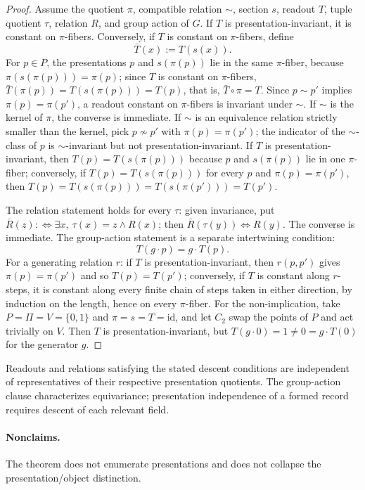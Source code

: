 \begin{proof}
Assume the quotient \(\pi\), compatible relation \(\sim\), section
\(s\), readout \(T\), tuple quotient \(\tau\), relation \(R\), and
group action of \(G\).  If \(T\) is presentation-invariant, it is
constant on \(\pi\)-fibers.  Conversely, if \(T\) is constant on
\(\pi\)-fibers, define
\[
  \bar T(x):=T(s(x)).
\]
For \(p\in P\), the presentations \(p\) and \(s(\pi(p))\) lie in the same
\(\pi\)-fiber, because \(\pi(s(\pi(p)))=\pi(p)\); since \(T\) is constant on
\(\pi\)-fibers, \(\bar T(\pi(p))=T(s(\pi(p)))=T(p)\), that is,
\(\bar T\circ\pi=T\). Since \(p\sim p'\) implies \(\pi(p)=\pi(p')\), a readout constant on
\(\pi\)-fibers is invariant under \(\sim\). If \(\sim\) is the kernel of
\(\pi\), the converse is immediate. If \(\sim\) is an equivalence relation
strictly smaller than the kernel, pick \(p\not\sim p'\) with
\(\pi(p)=\pi(p')\); the indicator of the \(\sim\)-class of \(p\) is
\(\sim\)-invariant but not presentation-invariant. If \(T\) is
presentation-invariant, then \(T(p)=T(s(\pi(p)))\) because \(p\) and
\(s(\pi(p))\) lie in one \(\pi\)-fiber; conversely, if \(T(p)=T(s(\pi(p)))\) for
every \(p\) and \(\pi(p)=\pi(p')\), then \(T(p)=T(s(\pi(p)))=T(s(\pi(p')))=T(p')\).

The relation statement holds for every \(\tau\): given invariance, put \(\bar R(z):\Leftrightarrow\exists x,\ \tau(x)=z\wedge R(x)\); then \(\bar R(\tau(y))\Leftrightarrow R(y)\). The converse is immediate.  The group-action statement is a separate
intertwining condition:
\[
  T(g\cdot p)=g\cdot T(p).
\]
For a generating relation \(r\): if \(T\) is presentation-invariant, then
\(r(p,p')\) gives \(\pi(p)=\pi(p')\) and so \(T(p)=T(p')\); conversely, if
\(T\) is constant along \(r\)-steps, it is constant along every finite chain of
steps taken in either direction, by induction on the length, hence on every
\(\pi\)-fiber.
For the non-implication, take \(P=\Pi=V=\{0,1\}\) and \(\pi=s=T=\mathrm{id}\),
and let \(C_2\) swap the points of \(P\) and act trivially on \(V\). Then \(T\) is
presentation-invariant, but \(T(g\cdot0)=1\ne0=g\cdot T(0)\) for the generator
\(g\).
\end{proof}

Readouts and relations satisfying the stated descent conditions are
independent of representatives of their respective presentation quotients.
The group-action clause characterizes equivariance; presentation independence
of a formed record requires descent of each relevant field.

\paragraph{Nonclaims.} The theorem does not enumerate presentations and does not collapse
the presentation/object distinction.

